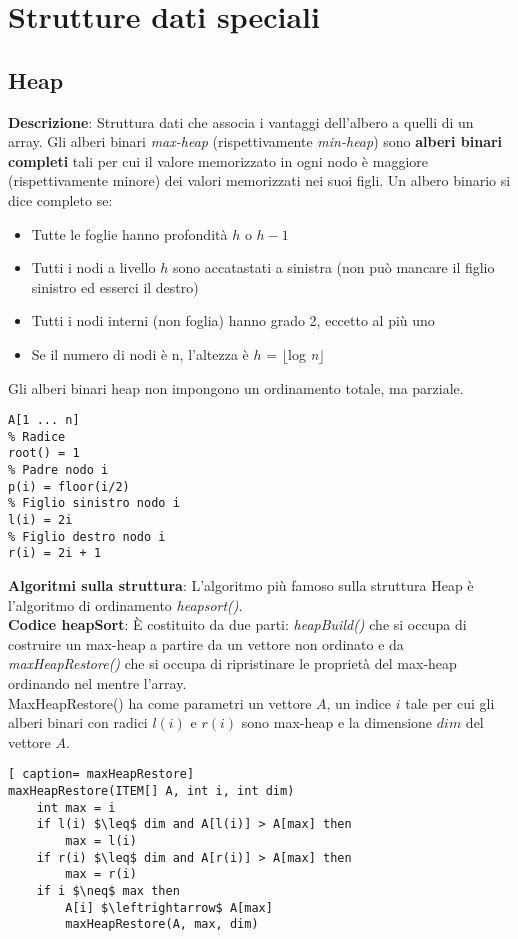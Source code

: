 \documentclass[../cheatSheetAlgoritmi.tex]{subfiles}
\begin{document}
\section{Strutture dati speciali}
\subsection{Heap}
\label{sec:heap}
\textbf{Descrizione}: Struttura dati che associa i vantaggi dell'albero a quelli di un array. Gli alberi binari \emph{max-heap} (rispettivamente \emph{min-heap}) sono \textbf{alberi binari completi} tali per cui il valore memorizzato in ogni nodo è maggiore (rispettivamente minore) dei valori memorizzati nei suoi figli. Un albero binario si dice completo se:
\begin{itemize}
 	\item Tutte le foglie hanno profondità $h$ o $h-1$ 
 	\item Tutti i nodi a livello $h$ sono accatastati a sinistra (non può mancare il figlio sinistro ed esserci il destro)
 	\item Tutti i nodi interni (non foglia) hanno grado 2, eccetto al più uno
 	\item Se il numero di nodi è n, l'altezza è $h$ = $\lfloor$log \textit{n}$\rfloor$
\end{itemize}
Gli alberi binari heap non impongono un ordinamento totale, ma parziale.
\begin{lstlisting}[caption= Memorizzazione Heap con Vettore]
% Vettore di memorizzazione
A[1 ... n]
% Radice
root() = 1
% Padre nodo i
p(i) = floor(i/2)
% Figlio sinistro nodo i
l(i) = 2i
% Figlio destro nodo i
r(i) = 2i + 1
\end{lstlisting}
\textbf{Algoritmi sulla struttura}: L'algoritmo più famoso sulla struttura Heap è l'algoritmo di ordinamento \emph{heapsort()}. \\
\textbf{Codice heapSort}: È costituito da due parti: \emph{heapBuild()} che si occupa di costruire un max-heap a partire da un vettore non ordinato e da \emph{maxHeapRestore()} che si occupa di ripristinare le proprietà del max-heap ordinando nel mentre l'array.  \\
MaxHeapRestore() ha come parametri un vettore $A$, un indice $i$ tale per cui gli alberi binari con radici $l(i)$ e $r(i)$ sono max-heap e la dimensione $dim$ del vettore $A$. 
\begin{lstlisting}[ caption= maxHeapRestore]
maxHeapRestore(ITEM[] A, int i, int dim)
	int max = i
	if l(i) $\leq$ dim and A[l(i)] > A[max] then
		max = l(i)
	if r(i) $\leq$ dim and A[r(i)] > A[max] then
		max = r(i)
	if i $\neq$ max then
		A[i] $\leftrightarrow$ A[max]
		maxHeapRestore(A, max, dim)
\end{lstlisting}
\end{document}
